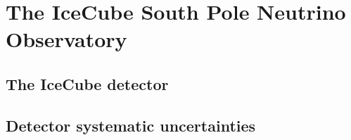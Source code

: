 \chapter{The IceCube South Pole Neutrino Observatory}\label{chapter:icecube}
\section{The IceCube detector}

\begingroup
\graphicspath{{results/HESE_Final_Paper/}}

\endgroup

\section{Detector systematic uncertainties\label{sec:detector_systematics}}
\begingroup
\graphicspath{{results/HESE_Final_Paper/}}

\endgroup